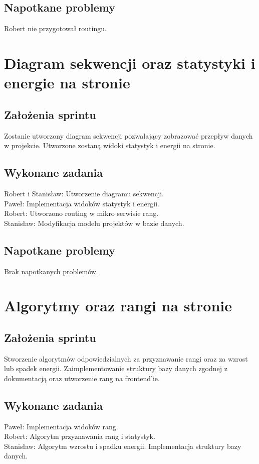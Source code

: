 \documentclass[a4paper,11pt]{report}
\begin{document}
\subsection {Napotkane problemy}
Robert nie przygotował routingu.

\section {Diagram sekwencji oraz statystyki i energie na stronie}
\label{sec:system_statystyk}
\subsection {Założenia sprintu}
Zostanie utworzony diagram sekwencji pozwalający zobrazować przepływ danych w projekcie. Utworzone zostaną widoki statystyk i energii na stronie.
\subsection {Wykonane zadania}
Robert i Stanisław: Utworzenie diagramu sekwencji.\\
Paweł: Implementacja widoków statystyk i energii. \\
Robert: Utworzono routing w mikro serwisie rang.\\
Stanisław: Modyfikacja modelu projektów w bazie danych.\\
\subsection {Napotkane problemy}
Brak napotkanych problemów.

\section {Algorytmy oraz rangi na stronie}
\label{sec:system_zarzadzania_energia_uzytkownika}
\subsection {Założenia sprintu}
Stworzenie algorytmów odpowiedzialnych za przyznawanie rangi oraz za wzrost lub spadek energii. Zaimplementowanie struktury bazy danych zgodnej z dokumentacją oraz utworzenie rang na frontend'ie.
\subsection {Wykonane zadania}
Paweł: Implementacja widoków rang. \\
Robert: Algorytm przyznawania rang i statystyk.\\
Stanisław: Algorytm wzrostu i spadku energii. Implementacja struktury bazy danych.\\
\end{document}
